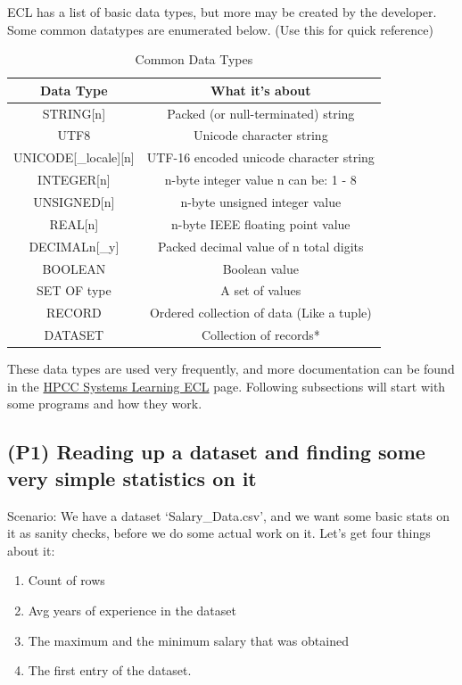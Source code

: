 \documentclass[a4paper,oneside,12pt]{book}
\begin{document}
ECL has a list of basic data types, but more may be created by the developer.
Some common datatypes are enumerated below. (Use this for quick reference)
\begin{table}[h]
\centering
\begin{tabular}{|c|c|}\hline
Data Type & What it's about \\\hline\hline
STRING[n] & Packed (or null-terminated) string \\\hline
UTF8 & Unicode character string \\\hline
UNICODE[\_locale][n] &  UTF-16 encoded unicode character string \\\hline
INTEGER[n] & n-byte integer value n can be: 1 - 8 \\\hline
UNSIGNED[n] & n-byte unsigned integer value \\\hline
REAL[n] & n-byte IEEE floating point value \\\hline
DECIMAL\textlangle{}n\textrangle{}[\_y] & Packed decimal value of n total digits \\\hline
BOOLEAN & Boolean value \\\hline
SET OF \textlangle{}type\textrangle{} & A set of values\\\hline
RECORD & Ordered collection of data (Like a tuple)\\\hline
DATASET & Collection of records* \\\hline
\end{tabular}
\caption{Common Data Types}
\end{table}

These data types are used very frequently, and more documentation can be found in the \href{https://hpccsystems.com/training/documentation/learning-ecl}{HPCC Systems Learning ECL} page. Following subsections will start with some programs and how they work.

\subsection[Program 1]{(P1) Reading up a dataset and finding some very simple statistics on it}

Scenario: We have a dataset `Salary\_Data.csv', and we want some basic stats on it as sanity checks, before we do some actual work on it. Let's get four things about it:

\begin{enumerate}
    \item Count of rows
    \item Avg years of experience in the dataset
    \item The maximum and the minimum salary that was obtained
    \item The first entry of the dataset.
\end{enumerate}
\end{document}
